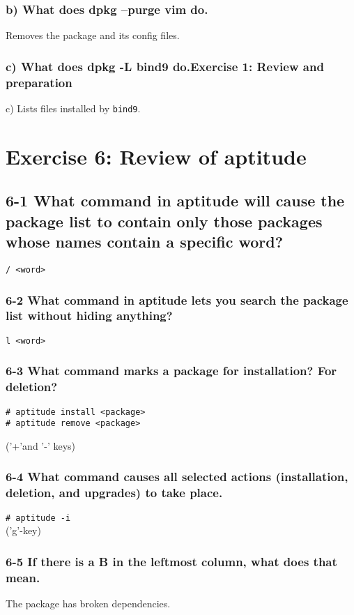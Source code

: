\subsubsection{b) What does dpkg --purge vim do.}
Removes the package and its config files.

\subsubsection{c) What does dpkg -L bind9 do.Exercise 1: Review and preparation}
c) Lists files installed by \verb=bind9=.
%



\section{Exercise 6: Review of aptitude}
\subsection{6-1 What command in aptitude will cause the package list to contain only those packages whose names contain a specific word?}
\verb=/ <word>=

\subsubsection{6-2 What command in aptitude lets you search the package list without hiding anything?}
\verb=l <word>=

\subsubsection{6-3 What command marks a package for installation? For deletion?}
\begin{verbatim}# aptitude install <package>
# aptitude remove <package>\end{verbatim}
('+'and '-' keys)

\subsubsection{6-4 What command causes all selected actions (installation, deletion, and upgrades) to take place.}
\verb=# aptitude -i=\\
('g'-key)

\subsubsection{6-5 If there is a B in the leftmost column, what does that mean.}
The package has broken dependencies.


